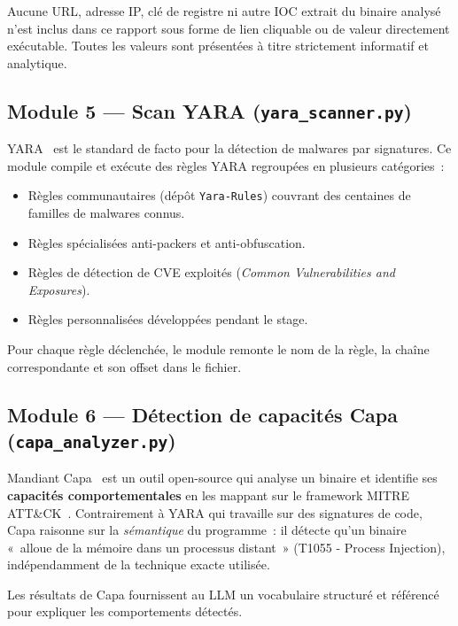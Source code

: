 \begin{warnbox}
Aucune URL, adresse IP, clé de registre ni autre IOC extrait du binaire analysé n'est inclus dans ce rapport sous forme de lien cliquable ou de valeur directement exécutable. Toutes les valeurs sont présentées à titre strictement informatif et analytique.
\end{warnbox}

\subsection{Module 5 --- Scan YARA (\texttt{yara\_scanner.py})}

YARA~\cite{yara2023} est le standard de facto pour la détection de malwares par signatures. Ce module compile et exécute des règles YARA regroupées en plusieurs catégories~:
\begin{itemize}
  \item Règles communautaires (dépôt \texttt{Yara-Rules}) couvrant des centaines de familles de malwares connus.
  \item Règles spécialisées anti-packers et anti-obfuscation.
  \item Règles de détection de CVE exploités (\textit{Common Vulnerabilities and Exposures}).
  \item Règles personnalisées développées pendant le stage.
\end{itemize}

Pour chaque règle déclenchée, le module remonte le nom de la règle, la chaîne correspondante et son offset dans le fichier.

\subsection{Module 6 --- Détection de capacités Capa (\texttt{capa\_analyzer.py})}

Mandiant Capa~\cite{capa2020} est un outil open-source qui analyse un binaire et identifie ses \textbf{capacités comportementales} en les mappant sur le framework MITRE ATT\&CK~\cite{mitre_attck}. Contrairement à YARA qui travaille sur des signatures de code, Capa raisonne sur la \textit{sémantique} du programme~: il détecte qu'un binaire «~alloue de la mémoire dans un processus distant~» (T1055 - Process Injection), indépendamment de la technique exacte utilisée.

Les résultats de Capa fournissent au LLM un vocabulaire structuré et référencé pour expliquer les comportements détectés.

